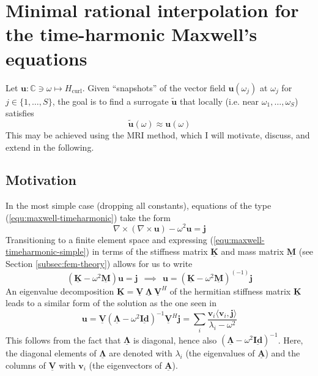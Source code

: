 \documentclass[11pt, a4paper]{article}
\begin{document}
\newpage
\section{Minimal rational interpolation for the time-harmonic Maxwell's equations}
\label{sec:mri}
Let $\mathbf{u} : \mathbb{C}\ni\omega \mapsto H_{\mathrm{curl}}$. Given \enquote{snapshots} of the
vector field $\mathbf{u}(\omega_j)$ at $\omega_j$ for $j \in \{1, \dots, S\}$, the
goal is to find a surrogate $\mathbf{\tilde{u}}$ that locally (i.e. near $\omega_1, \dots, \omega_S$)
satisfies
\begin{equation}
    \mathbf{\tilde{u}}(\omega) \approx \mathbf{u}(\omega)
\end{equation}
This may be achieved using the \acrfull{MRI} method, which I will motivate,
discuss, and extend in the following.

\subsection{Motivation}
\label{subsec:motivation}

In the most simple case (dropping all constants), equations of the type
(\ref{equ:maxwell-timeharmonic}) take the form
\begin{equation}
    \nabla \times (\nabla \times \mathbf{u}) - \omega^2 \mathbf{u} = \mathbf{j}
    \label{equ:maxwell-timeharmonic-simple}
\end{equation}
Transitioning to a finite element space and expressing (\ref{equ:maxwell-timeharmonic-simple})
in terms of the stiffness matrix $\mathbf{\underline{K}}$
and mass matrix $\mathbf{\underline{M}}$ (see Section \ref{subsec:fem-theory})
allows for us to write
\begin{equation}
    (\mathbf{\underline{K}} - \omega^2 \mathbf{\underline{M}}) \mathbf{u} = \mathbf{j} ~~\implies~~ \mathbf{u} = (\mathbf{\underline{K}} - \omega^2 \mathbf{\underline{M}})^{(-1)} \mathbf{j}
\end{equation}
An eigenvalue decomposition $\mathbf{\underline{K}} = \mathbf{\underline{V}}
~ \boldsymbol{\underline{\Lambda}} ~ \mathbf{\underline{V}}^H$ of the hermitian
stiffness matrix $\mathbf{\underline{K}}$
leads to a similar form of the solution as the one seen in \cite{helmholtz-motivation}
\begin{equation}
    \mathbf{u} = \mathbf{\underline{V}} (\boldsymbol{\underline{\Lambda}} - \omega^2 \mathbf{\underline{Id}})^{-1} \mathbf{\underline{V}}^H \mathbf{j} 
    = \sum_i \frac{\mathbf{v}_i \langle \mathbf{v}_i, \mathbf{j} \rangle}{\lambda_i - \omega^2} \label{equ:motivation}
\end{equation}
This follows from the fact that $\boldsymbol{\underline{\Lambda}}$ is diagonal,
hence also $(\boldsymbol{\underline{\Lambda}} - \omega^2 \mathbf{\underline{Id}})^{-1}$.
Here, the diagonal elements of $\boldsymbol{\underline{\Lambda}}$ are denoted with 
$\lambda_i$ (the eigenvalues of $\mathbf{\underline{A}}$) and the columns of
$\mathbf{\underline{V}}$ with $\mathbf{v}_i$ (the eigenvectors of $\mathbf{\underline{A}}$).
\end{document}
